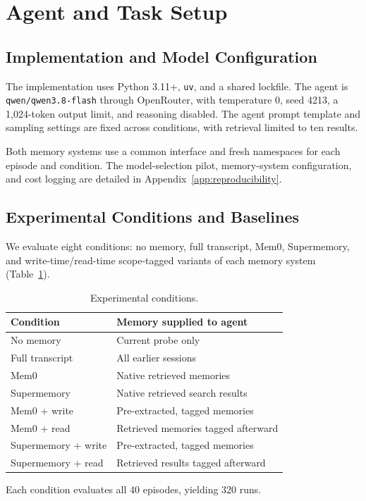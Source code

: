 \section{Agent and Task Setup}
\label{sec:experimental-setup}

\subsection{Implementation and Model Configuration}

The implementation uses Python 3.11+, \texttt{uv}, and
a shared lockfile. The agent is
\texttt{qwen/qwen3.8-flash} through OpenRouter, with
temperature 0, seed 4213, a 1,024-token output limit,
and reasoning disabled. The agent prompt template and
sampling settings are fixed across conditions, with
retrieval limited to ten results.

Both memory systems use a common interface and fresh
namespaces for each episode and condition. The
model-selection pilot, memory-system configuration,
and cost logging are detailed in
Appendix~\ref{app:reproducibility}.


\subsection{Experimental Conditions and Baselines}
\label{sec:conditions}

We evaluate eight conditions: no memory, full transcript,
Mem0, Supermemory, and write-time/read-time scope-tagged
variants of each memory system (Table~\ref{tab:conditions}).

\begin{table}[t]
\centering
\small
\caption{Experimental conditions.}
\label{tab:conditions}
\begin{tabularx}{\linewidth}{lX}
\toprule
Condition & Memory supplied to agent \\
\midrule
No memory & Current probe only \\
Full transcript & All earlier sessions \\
Mem0 & Native retrieved memories \\
Supermemory & Native retrieved search results \\
Mem0 + write & Pre-extracted, tagged memories \\
Mem0 + read & Retrieved memories tagged afterward \\
Supermemory + write & Pre-extracted, tagged memories \\
Supermemory + read & Retrieved results tagged afterward \\
\bottomrule
\end{tabularx}
\end{table}

Each condition evaluates all 40 episodes, yielding
320 runs.

